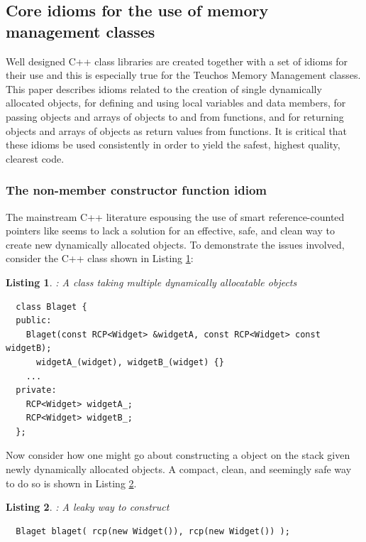 \documentclass[pdf,ps2pdf,11pt]{SANDreport}
\newtheorem{listing}{Listing}
\begin{document}
%
{}\subsection{Core idioms for the use of memory management classes}
\label{sec:idioms}
%

Well designed C++ class libraries are created together with a set of
idioms for their use and this is especially true for the Teuchos
Memory Management classes.  This paper describes idioms related to the
creation of single dynamically allocated objects, for defining and
using local variables and data members, for passing objects and arrays
of objects to and from functions, and for returning objects and arrays
of objects as return values from functions.  It is critical that these
idioms be used consistently in order to yield the safest, highest
quality, clearest code.


%
{}\subsubsection{The non-member constructor function idiom}
\label{sec:nonmember-constructor-idiom}
%

The mainstream C++ literature espousing the use of smart
reference-counted pointers like {} seems to
lack a solution for an effective, safe, and clean way to create new
dynamically allocated objects.  To demonstrate the issues involved,
consider the C++ class {} shown in Listing
{}\ref{listing:BlagetClass}:

\begin{listing}: A class taking multiple dynamically allocatable objects \\
\label{listing:BlagetClass}
{\small\begin{verbatim}
  class Blaget {
  public:
    Blaget(const RCP<Widget> &widgetA, const RCP<Widget> const widgetB);
      widgetA_(widget), widgetB_(widget) {}
    ...
  private:
    RCP<Widget> widgetA_;
    RCP<Widget> widgetB_;
  };
\end{verbatim}}
\end{listing}

Now consider how one might go about constructing a {}
object on the stack given newly dynamically allocated {}
objects.  A compact, clean, and seemingly safe way to do so is shown
in Listing {}\ref{listing:BlagetConstruct1}.

\begin{listing}: A leaky way to construct \\
\label{listing:BlagetConstruct1}
{\small\begin{verbatim}
  Blaget blaget( rcp(new Widget()), rcp(new Widget()) );
\end{verbatim}}
\end{listing}
\end{document}
